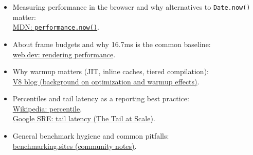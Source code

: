 \begin{itemize}
\item Measuring performance in the browser and why alternatives to \texttt{Date.now()} matter:\\
\href{https://developer.mozilla.org/en-US/docs/Web/API/Performance/now}{MDN: \texttt{performance.now()}}.

\item About frame budgets and why 16.7ms is the common baseline:\\
\href{https://web.dev/articles/rendering-performance}{web.dev: rendering performance}.

\item Why warmup matters (JIT, inline caches, tiered compilation):\\
\href{https://v8.dev/blog}{V8 blog (background on optimization and warmup effects)}.

\item Percentiles and tail latency as a reporting best practice:\\
\href{https://en.wikipedia.org/wiki/Percentile}{Wikipedia: percentile},\\
\href{https://research.google/pubs/pub40801/}{Google SRE: tail latency (The Tail at Scale)}.

\item General benchmark hygiene and common pitfalls:\\
\href{https://benchmarking.sites/}{benchmarking.sites (community notes)}.
\end{itemize}
